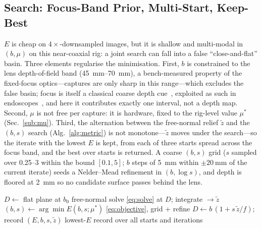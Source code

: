 \documentclass[conference]{IEEEtran}
\newcommand{\zt}{\tilde z}
\begin{document}
\subsection{Search: Focus-Band Prior, Multi-Start, Keep-Best}
\label{sub:search}
$E$ is cheap on $4\times$-downsampled images, but it is shallow and
multi-modal in $(b,\mu)$ on this near-coaxial rig: a joint search can
fall into a false ``close-and-flat'' basin.  Three elements regularise
the minimisation.  First, $b$ is constrained to the lens depth-of-field
band (\SIrange{45}{70}{\milli\meter}), a bench-measured property of the
fixed-focus optics---captures are only sharp in this range---which
excludes the false basin; focus is itself a classical coarse depth
cue~\cite{pentland1987}, exploited as such in
endoscopes~\cite{takeshita2009}, and here it contributes exactly one
interval, not a depth map.  Second, $\mu$ is not free per capture: it is
hardware, fixed to the rig-level value $\mu^\ast$ (Sec.~\ref{sub:mu}).
Third, the alternation between the free-normal relief $\zt$ and the
$(b,s)$ search (Alg.~\ref{alg:metric}) is not monotone---$\zt$ moves
under the search---so the iterate with the lowest $E$ is kept, from each
of three starts spread across the focus band, and the best over starts is
returned.  A coarse $(b,s)$ grid ($s$ sampled over 0.25--3 within the bound
$[0.1,5]$; $b$ steps of \SI{5}{\milli\meter} within
$\pm\SI{20}{\milli\meter}$ of the current iterate) seeds a Nelder--Mead
refinement in $(b,\log s)$, and depth is
floored at \SI{2}{\milli\meter} so no candidate surface passes behind the
lens.

\begin{algorithm}[t]
\caption{Metric near-field reconstruction}\label{alg:metric}
\begin{algorithmic}[1]
  \State $D\gets$ flat plane at $b_0$
    \State free-normal solve \eqref{eq:solve} at $D$; integrate $\to\zt$
    \State $(b,s)\gets\arg\min E(b,s;\mu^\ast)$ \eqref{eq:objective},
           grid + refine
    \State $D\gets b\,(1+s\,\zt/f)$; record $(E,b,s,\zt)$
  \EndFor
\EndFor
\State \Return lowest-$E$ record over all starts and iterations
\end{algorithmic}
\end{algorithm}
\end{document}
